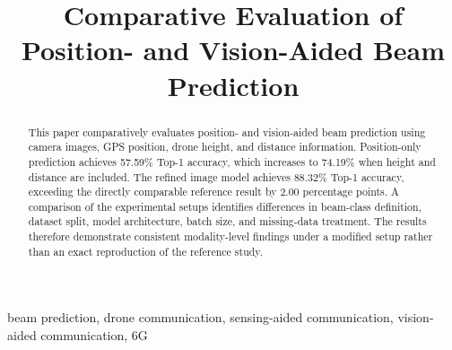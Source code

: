 \documentclass[conference]{IEEEtran}
\title{Comparative Evaluation of Position- and Vision-Aided Beam Prediction}
\author{
\IEEEauthorblockN{Author Name}
\IEEEauthorblockA{
Department or Institution Name\\
City, Country\\
author@email.com}
}
\begin{document}
\maketitle

\begin{abstract}
This paper comparatively evaluates position- and vision-aided beam prediction
using camera images, GPS position, drone height, and distance information.
Position-only prediction achieves 57.59\% Top-1 accuracy, which increases to
74.19\% when height and distance are included. The refined image model achieves
88.32\% Top-1 accuracy, exceeding the directly comparable reference result by
2.00 percentage points. A comparison of the experimental setups identifies
differences in beam-class definition, dataset split, model architecture, batch
size, and missing-data treatment. The results therefore demonstrate consistent
modality-level findings under a modified setup rather than an exact
reproduction of the reference study.
\end{abstract}

\begin{IEEEkeywords}
beam prediction, drone communication, sensing-aided communication,
vision-aided communication, 6G
\end{IEEEkeywords}


\end{document}
